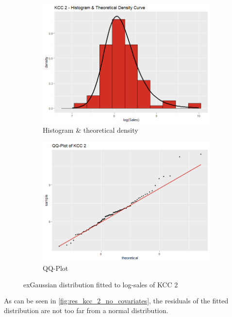  \begin{figure}[H]
\centering
\begin{subfigure}{.45\textwidth}
  \centering
  \includegraphics[width=\linewidth]{figures/kcc_2_density.png}
  \caption{Histogram \& theoretical density}
  \label{fig:kcc_2_density}
\end{subfigure}
\begin{subfigure}{.45\textwidth}
  \centering
  \includegraphics[width=\linewidth]{figures/kcc_2_qqplot.png}
  \caption{QQ-Plot}
  \label{fig:kcc_2_qqplot}
\end{subfigure}
\caption{exGaussian distribution fitted to log-sales of \ac{KCC} 2}
\label{fig:kcc_2_marginal}
\end{figure} 


As can be seen in \autoref{fig:res_kcc_2_no_covariates}, the residuals of the fitted distribution are not too far from a normal distribution. 
\\



